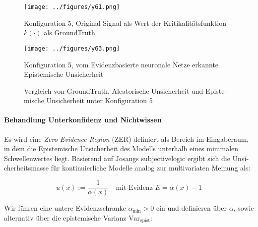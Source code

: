 \begin{otherlanguage}{ngerman}
\begin{figure}[!ht]
  \begin{minipage}[t]{0.32\textwidth}
    \centering
    \texttt{[image: ../figures/y61.png]}
    \caption*{Konfiguration 5, Original-Signal als Wert der Kritikalitätsfunktion \(k(\cdot)\) als \gls{GroundTruth}}
    \label{fig:bild51}
  \end{minipage}
  \hfill
  \begin{minipage}[t]{0.32\textwidth}
    \centering
    \texttt{[image: ../figures/y63.png]}
    \caption*{Konfiguration 5, vom \gls{Evidenzbasierte neuronale Netze} erkannte \gls{Epistemische Unsicherheit}}
    \label{fig:bild53}
  \end{minipage}

  \caption{Vergleich von \gls{GroundTruth}, \gls{Aleatorische Unsicherheit} und \gls{Epistemische Unsicherheit} unter Konfiguration 5}
  \label{fig:three_subfigures5}
\end{figure}



\paragraph{Behandlung Unterkonfidenz und Nichtwissen} Es wird eine \textit{Zero Evidence Region} (ZER) definiert als Bereich im Eingaberaum, in dem die \gls{Epistemische Unsicherheit} des Modells unterhalb eines minimalen Schwellenwertes liegt. Basierend auf Josangs \gls{subjectivelogic} ergibt sich die Unsicherheitsmasse für kontinuierliche Modelle analog zur multivariaten Meinung als:

\[
u(x) := \frac{1}{\alpha(x)} \quad \text{mit Evidenz } E = \alpha(x) - 1
\]

Wir führen eine untere Evidenzschranke \( \alpha_{\min} > 0 \) ein und definieren über $\alpha$, sowie alternativ über die epistemische Varianz $\text{Var}_{\text{epist}}$:


\end{otherlanguage}
